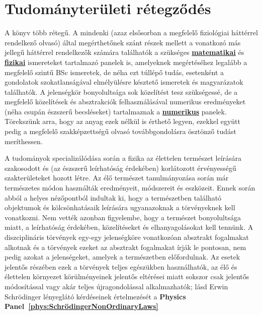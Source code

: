 
\section{Tudományterületi rétegződés\label{sec:Intro-Disciplinary}}



A könyv több rétegű. A mindenki (azaz elsősorban a megfelelő
fiziológiai háttérrel rendelkező olvasó)
által megérthetőnek szánt részek mellett a vonatkozó más jellegű háttérrel rendelkezők számára találhatók 
a szükséges
\textbf{\hyperlink{intro:MyMathematicsPanel}{matematikai}} és
\textbf{\hyperlink{intro:MyPhysicsPanel}{fizikai}}
ismereteket tartalmazó panelek is, amelyeknek megértéséhez legalább a megfelelő szintű BSc ismeretek, de néha ezt túllépő tudás, esetenként 
a gondolatok szokatlanságával elmélyülésre késztető 
ismeretek és magyarázatok találhatók.
A jelenségkör bonyolultsága sok közelítést tesz szükségessé,
de a megfelelő közelítések és absztrakciók felhasználásával 
numerikus eredményeket (néha csupán észszerű becsléseket)
tartalmaznak a \textbf{\hyperlink{num:MyNumericsPanel}{numerikus}} panelek.
Törekszünk arra, hogy az anyag ezek nélkül is érthető legyen,
ezekkel együtt pedig a megfelelő szakképzettségű olvasó
továbbgondolásra ösztönző tudást meríthessen.



{
A tudományok specializálódása során a fizika az élettelen természet 
leírására szakosodott és (az észszerű leírhatóság érdekében)
korlátozott érvényességű szakterületeket hozott létre.
Az élő természet tanulmányozása során már természetes módon
használták eredményeit, módszereit és eszközeit.
Ennek során abból a helyes nézőpontból indultak ki, hogy
a természetben található objektumok és kölcsönhatásaik leírására
ugyanazoknak a törvényeknek kell vonatkozni. Nem vették azonban figyelembe, hogy a természet bonyolultsága miatt,
a leírhatóság érdekében, közelítéseket és elhanyagolásokat kell tennünk. A diszciplináris törvények egy-egy jelenségköre vonatkozóan
absztrakt fogalmakat alkotnak és a törvények ezeket az absztrakt
fogalmakat írják le pontosan, nem pedig azokat a jelenségeket,
amelyek a természetben előfordulnak. Az esetek jelentős részében
ezek a törvények teljes egészükben használhatók, 
az élő és élettelen környezet körülményeinek jelentős eltérései miatt
sokszor csak jelentős módosítással vagy akár teljes újragondolással alkalmazhatók; lásd Erwin Schrödinger lényeglátó kérdéseinek értelmezését
a \textbf{Physics Panel~\ref{phys:SchrödingerNonOrdinaryLaws}} 
}



